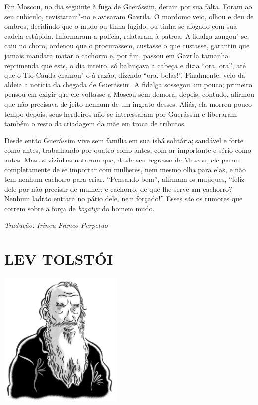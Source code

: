 Em Moscou, no dia seguinte à fuga de Guerássim, deram por sua falta.
Foram ao seu cubículo, revistaram"-no e avisaram Gavrila. O mordomo veio,
olhou e deu de ombros, decidindo que o mudo ou tinha fugido, ou tinha se
afogado com sua cadela estúpida. Informaram a polícia, relataram à
patroa. A fidalga zangou"-se, caiu no choro, ordenou que o procurassem,
custasse o que custasse, garantiu que jamais mandara matar o cachorro e,
por fim, passou em Gavrila tamanha reprimenda que este, o dia inteiro,
só balançava a cabeça e dizia ``ora, ora'', até que o Tio Cauda chamou"-o
à razão, dizendo ``ora, bolas!''. Finalmente, veio da aldeia a notícia
da chegada de Guerássim. A fidalga sossegou um pouco; primeiro pensou em
exigir que ele voltasse a Moscou sem demora, depois, contudo, afirmou
que não precisava de jeito nenhum de um ingrato desses. Aliás, ela
morreu pouco tempo depois; seus herdeiros não se interessaram por
Guerássim e liberaram também o resto da criadagem da mãe em troca de
tributos.

Desde então Guerássim vive sem família em sua isbá solitária; saudável e
forte como antes, trabalhando por quatro como antes, com ar importante e
sério como antes. Mas os vizinhos notaram que, desde seu regresso de
Moscou, ele parou completamente de se importar com mulheres, nem mesmo
olha para elas, e não tem nenhum cachorro para criar. ``Pensando bem'',
afirmam os mujiques, ``feliz dele por não precisar de mulher; e
cachorro, de que lhe serve um cachorro? Nenhum ladrão entrará no pátio
dele, nem forçado!'' Esses são os rumores que correm sobre a força de
\emph{bogatyr} do homem mudo.

\medskip

{\footnotesize\hfill\emph{Tradução: Irineu Franco Perpetuo}}


\part[LEV TOLSTÓI]{LEV TOLSTÓI }

\pagebreak
\thispagestyle{empty}
\mbox{}
\vfill
\begin{center}
\includegraphics[width=6cm]{./imgs/autor4.jpg}
\end{center}


